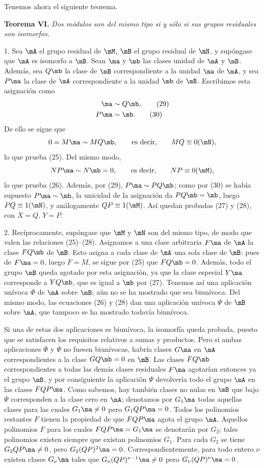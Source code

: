 \documentclass[11pt]{article}
\begin{document}
Tenemos ahora el siguiente teorema.

\textbf{Teorema VI.} \emph{Dos módulos son del mismo tipo si y sólo si sus grupos residuales son isomorfos.}

1. Sea $\mA$ el grupo residual de $\mM$, $\mB$ el grupo residual de $\mN$, y supóngase que $\mA$ es isomorfo a $\mB$. Sean $\ma$ y $\mb$ las clases unidad de $\mA$ y $\mB$. Además, sea $Q\mb$ la clase de $\mB$ correspondiente a la unidad $\ma$ de $\mA$, y sea $P\ma$ la clase de $\mA$ correspondiente a la unidad $\mb$ de $\mB$. Escribimos esta asignación como
\begin{align}
 \ma&\sim Q\mb,\tag{29}\\
 P\ma&\sim\mb.\tag{30}
\end{align}
De ello se sigue que
\[
 0=M\ma\sim MQ\mb,
 \qquad\text{es decir,}\qquad MQ\equiv0(\mN),
\]
lo que prueba (25). Del mismo modo,
\[
 NP\ma\sim N\mb=0,
 \qquad\text{es decir,}\qquad NP\equiv0(\mM),
\]
lo que prueba (26). Además, por (29), $P\ma\sim PQ\mb$; como por (30) se había supuesto $P\ma\sim\mb$, la unicidad de la asignación da $PQ\mb=\mb$, luego $PQ\equiv1(\mN)$, y análogamente $QP\equiv1(\mM)$. Así quedan probadas (27) y (28), con $X=Q$, $Y=P$.

2. Recíprocamente, supóngase que $\mM$ y $\mN$ son del mismo tipo, de modo que valen las relaciones (25)--(28). Asignamos a una clase arbitraria $F\ma$ de $\mA$ la clase $FQ\mb$ de $\mB$. Esto asigna a cada clase de $\mA$ una sola clase de $\mB$: pues de $F\ma=0$, luego $F=M$, se sigue por (25) que $FQ\mb=0$. Además, todo el grupo $\mB$ queda agotado por esta asignación, ya que la clase especial $Y\ma$ corresponde a $YQ\mb$, que es igual a $\mb$ por (27). Tenemos así una aplicación unívoca $\Phi$ de $\mA$ sobre $\mB$; aún no se ha mostrado que sea biunívoca. Del mismo modo, las ecuaciones (26) y (28) dan una aplicación unívoca $\Psi$ de $\mB$ sobre $\mA$, que tampoco se ha mostrado todavía biunívoca.

Si una de estas dos aplicaciones es biunívoca, la isomorfía queda probada, puesto que se satisfacen los requisitos relativos a sumas y productos. Pero si ambas aplicaciones $\Phi$ y $\Psi$ no fuesen biunívocas, habría clases $G\ma$ en $\mA$ correspondientes a la clase $GQ\mb=0$ en $\mB$. Las clases $FQ\mb$ correspondientes a todas las demás clases residuales $F\ma$ agotarían entonces ya el grupo $\mB$, y por consiguiente la aplicación $\Psi$ devolvería todo el grupo $\mA$ en las clases $FQP\ma$. Como sabemos, hay también clases no nulas en $\mB$ que bajo $\Psi$ corresponden a la clase cero en $\mA$; denotamos por $G_1\ma$ todas aquellas clases para las cuales $G_1\ma\ne0$ pero $G_1QP\ma=0$. Todos los polinomios restantes $F$ tienen la propiedad de que $FQP\ma$ agota el grupo $\mA$. Aquellos polinomios $F$ para los cuales $FQP\ma=G_1\ma$ se denotarán por $G_2$; tales polinomios existen siempre que existan polinomios $G_1$. Para cada $G_2$ se tiene $G_2QP\ma\ne0$, pero $G_2(QP)^2\ma=0$. Correspondientemente, para todo entero $\nu$ existen clases $G_\nu\ma$ tales que $G_\nu(QP)^{\nu-1}\ma\ne0$ pero $G_\nu(QP)^\nu\ma=0$.
\end{document}
